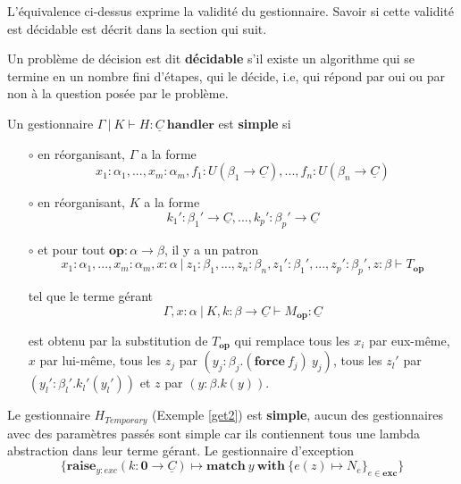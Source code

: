 L'équivalence ci-dessus exprime la validité du gestionnaire. Savoir si cette  validité est décidable est décrit dans la section qui suit. 

\begin{definition}
	Un problème de décision est dit \textbf{décidable} s'il existe un algorithme qui se termine en un nombre fini d'étapes, qui le décide, i.e, qui répond par oui ou par non à la question posée par le problème.
\end{definition}

\begin{definition}
	Un gestionnaire $\Gamma~|~K \vdash H:\underline{C}~\textbf{handler}$ est \textbf{simple} si
	
	\begin{enumerate}
		\item[$\circ$] en réorganisant, $\Gamma$ a la forme 
		\[x_1:\alpha_1,...,x_m:\alpha_m,f_1:U(\beta_1 \rightarrow \underline{C}),...,f_n:U(\beta_n \rightarrow \underline{C})\]
		
		\item[$\circ$] en réorganisant, $K$ a la forme
		\[k_1':\beta_1' \rightarrow \underline{C},...,k_p':\beta_p' \rightarrow \underline{C}\]
		
		\item[$\circ$] et pour tout $\textbf{op}: \alpha \rightarrow \beta$, il y a un patron
		\[x_1:\alpha_1,...,x_m:\alpha_m,x:\alpha~|~z_1:\beta_1,...,z_n:\beta_n,z_1':\beta_1',...,z_p':\beta_p',z:\beta \vdash T_\textbf{op}\]
		
		tel que le terme gérant 
		\[\Gamma,x:\alpha~|~K,k:\beta \rightarrow \underline{C} \vdash M_\textbf{op}:\underline{C}\]
		
		est obtenu par la substitution de $T_\textbf{op}$ qui remplace tous les $x_i$ par eux-même, $x$ par lui-même, tous les $z_j$ par $(y_j:\beta_j.(\textbf{force}~f_j)~y_j)$, tous les $z_l'$ par $(y_l':\beta_l'.k_l'(y_l'))$ et $z$ par $(y:\beta.k(y))$.
	\end{enumerate}
\end{definition}

Le gestionnaire $H_{Temporary}$ (Exemple \ref{get2}) est \textbf{simple}, aucun des gestionnaires avec des paramètres passés sont simple car ils contiennent tous une lambda abstraction dans leur terme gérant. Le gestionnaire d'exception 
\[\{\textbf{raise}_{y:exc}(k:\textbf{0} \rightarrow \underline{C}) \mapsto \textbf{match}~y~\textbf{with}~\{e(z) \mapsto N_e\}_{e \in \textbf{exc}}\}\] 

